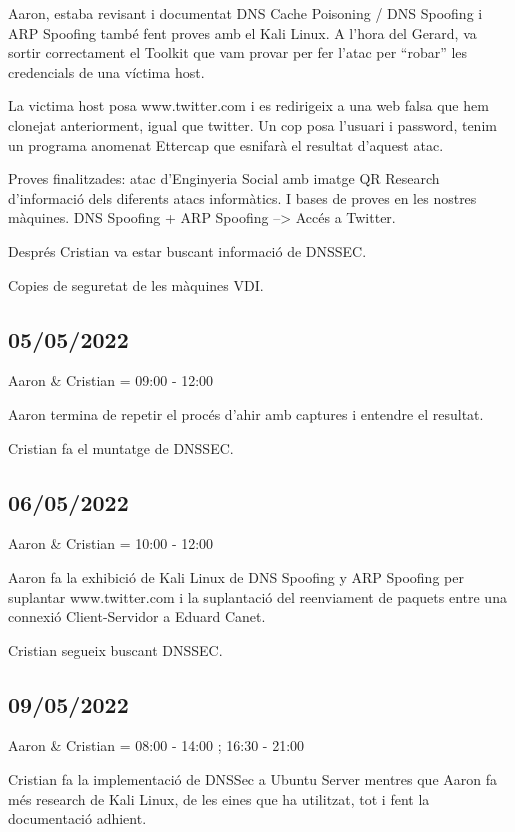 \documentclass[]{article}
\begin{document}
Aaron, estaba revisant i documentat DNS Cache Poisoning / DNS Spoofing i
ARP Spoofing també fent proves amb el Kali Linux. A l'hora del Gerard,
va sortir correctament el Toolkit que vam provar per fer l'atac per
``robar'' les credencials de una víctima host.

La victima host posa www.twitter.com i es redirigeix a una web falsa que
hem clonejat anteriorment, igual que twitter. Un cop posa l'usuari i
password, tenim un programa anomenat Ettercap que esnifarà el resultat
d'aquest atac.

Proves finalitzades: atac d'Enginyeria Social amb imatge QR Research
d'informació dels diferents atacs informàtics. I bases de proves en les
nostres màquines. DNS Spoofing + ARP Spoofing --\textgreater{} Accés a
Twitter.

Després Cristian va estar buscant informació de DNSSEC.

Copies de seguretat de les màquines VDI.

\hypertarget{section-9}{%
\subsection{05/05/2022}\label{section-9}}

Aaron \& Cristian = 09:00 - 12:00

Aaron termina de repetir el procés d'ahir amb captures i entendre el
resultat.

Cristian fa el muntatge de DNSSEC.

\hypertarget{section-10}{%
\subsection{06/05/2022}\label{section-10}}

Aaron \& Cristian = 10:00 - 12:00

Aaron fa la exhibició de Kali Linux de DNS Spoofing y ARP Spoofing per
suplantar www.twitter.com i la suplantació del reenviament de paquets
entre una connexió Client-Servidor a Eduard Canet.

Cristian segueix buscant DNSSEC.

\hypertarget{section-11}{%
\subsection{09/05/2022}\label{section-11}}

Aaron \& Cristian = 08:00 - 14:00 ; 16:30 - 21:00

Cristian fa la implementació de DNSSec a Ubuntu Server mentres que Aaron
fa més research de Kali Linux, de les eines que ha utilitzat, tot i fent
la documentació adhient.
\end{document}
